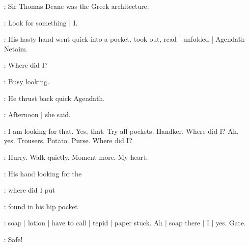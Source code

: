 \BloomInt:
Sir Thomas Deane was the Greek architecture.


\BloomInt:
Look for something |
I.

:
His hasty hand went quick into a pocket,
took out,
read |
unfolded |
Agendath Netaim.

\BloomInt:
Where did I?

\BloomInt:
Busy looking.

:
He thrust back quick Agendath.

\BloomInt:
Afternoon |
she said.

\BloomInt:
I am looking for that.
Yes, that.
Try all pockets.
Handker.
Where did I?
Ah, yes.
Trousers.
Potato.
Purse.
Where did I?

\BloomInt:
Hurry.
Walk quietly.
Moment more.
My heart.

:
His hand looking for the

\BloomInt:
where did I put

:
found in his hip pocket

\BloomInt:
soap |
lotion |
have to call |
tepid |
paper stuck.
Ah |
soap there |
I |
yes.
Gate.

\BloomInt:
Safe!


